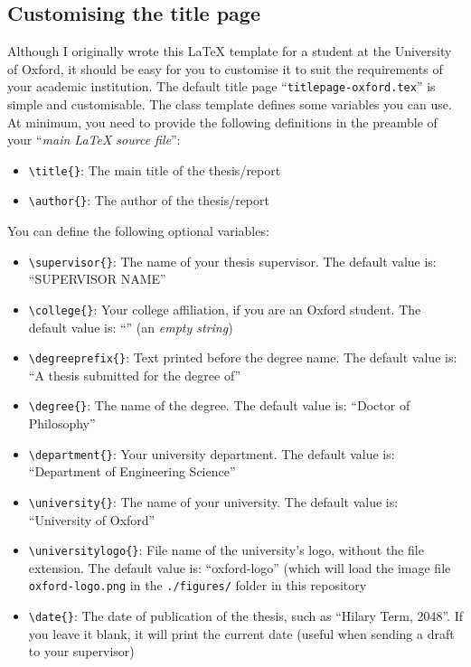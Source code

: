 \subsection{Customising the title page}


Although I originally wrote this LaTeX template for a student at the University of Oxford, it should be easy for you to customise it to suit the requirements of your academic institution. The default title page ``\verb|titlepage-oxford.tex|'' is simple and customisable. The class template defines some variables you can use. At minimum, you need to provide the following definitions in the preamble of your ``\textit{main LaTeX source file}'':

\begin{itemize}

    \item \verb|\title{}|: The main title of the thesis/report

    \item \verb|\author{}|: The author of the thesis/report

\end{itemize}

You can define the following optional variables:

\begin{itemize}

    \item \verb|\supervisor{}|: The name of your thesis supervisor. The default value is: ``SUPERVISOR NAME''

    \item \verb|\college{}|: Your college affiliation, if you are an Oxford student. The default value is: ``'' (an \textit{empty string})

    \item \verb|\degreeprefix{}|: Text printed before the degree name. The default value is: ``A thesis submitted for the degree of''

    \item \verb|\degree{}|: The name of the degree. The default value is: ``Doctor of Philosophy''

    \item \verb|\department{}|: Your university department. The default value is: ``Department of Engineering Science''

    \item \verb|\university{}|: The name of your university. The default value is: ``University of Oxford''

    \item \verb|\universitylogo{}|: File name of the university's logo, without the file extension. The default value is: ``oxford-logo'' (which will load the image file \verb|oxford-logo.png| in the \verb|./figures/| folder in this repository

    \item \verb|\date{}|: The date of publication of the thesis, such as ``Hilary Term, 2048''. If you leave it blank, it will print the current date (useful when sending a draft to your supervisor)

\end{itemize}



